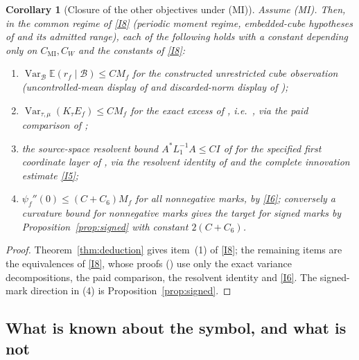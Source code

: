 \documentclass[11pt]{article}
\newtheorem{corollary}[theorem]{Corollary}
\theoremstyle{definition}
\newcommand{\E}{\mathbb{E}}
\newcommand{\Var}{\operatorname{Var}}
\begin{document}
\begin{corollary}[Closure of the other objectives under (MI)]\label{cor:closure}
Assume (MI). Then, in the common regime of \ref{I8} (periodic moment regime, embedded-cube hypotheses of
\cite[geometry-regime display]{cub} and its admitted range), each of the following holds with a constant depending only on
$C_{\mathrm{MI}},C_W$ and the constants of \ref{I8}:
\begin{enumerate}
\item[(1)] $\Var_{\mathcal B}\E(r_f\mid\mathcal B)\le CM_f$ for the constructed unrestricted cube observation
(uncontrolled-mean display of \cite{cub} and discarded-norm display of \cite{rsc});
\item[(2)] $\Var_{\tau,\mu}(K_\tau E_f)\le CM_f$ for the exact excess of \cite[residual display]{tra}, i.e.\ \cite[missing-bound display]{tra}, via the paid comparison of \cite{rsc};
\item[(3)] the source-space resolvent bound $A^*L_1^{-1}A\le CI$ of \cite[missing-bound display]{cur} for the specified first coordinate layer of
\cite[subsection ``An exact source-specific operator target'']{rsc}, via the resolvent identity of \cite{cur} and the complete innovation estimate \ref{I5};
\item[(4)] $\psi_f''(0)\le(C+C_6)M_f$ for all nonnegative marks, by \ref{I6}; conversely a curvature bound for
nonnegative marks gives the target for signed marks by Proposition~\ref{prop:signed} with constant $2(C+C_6)$.
\end{enumerate}
\end{corollary}
\begin{proof}
Theorem~\ref{thm:deduction} gives item~(1) of \ref{I8}; the remaining items are the equivalences of \ref{I8},
whose proofs (\cite[subsection ``Equivalence of the remaining quantitative objectives'']{rsc}) use only the exact variance decompositions, the paid comparison, the resolvent identity and \ref{I6}.
The signed-mark direction in (4) is Proposition~\ref{prop:signed}.
\end{proof}

\subsection{What is known about the symbol, and what is not}
\end{document}
